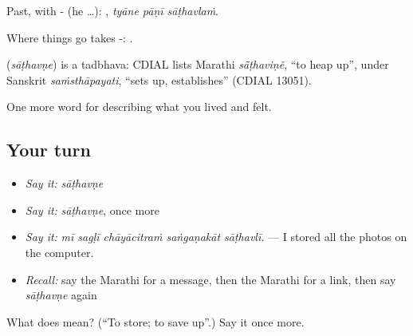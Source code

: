 Past, with - (he …):   , \emph{tyāne pāṇī sāṭhavlaṁ}.

Where things go takes -:  .

\begin{cousinweb}
\textbf{} (\emph{sāṭhavṇe}) is a tadbhava: CDIAL lists Marathi \emph{sā̃ṭhaviṇẽ}, \textquotedblleft{}to heap up\textquotedblright{}, under Sanskrit \emph{saṁsthāpayati}, \textquotedblleft{}sets up, establishes\textquotedblright{} (CDIAL 13051).
\end{cousinweb}

\begin{grammarlens}[title={What you've built}]
One more word for describing what you lived and felt.
\end{grammarlens}

\subsection*{Your turn}
\begin{itemize}
\raggedright
  \item \emph{Say it:} \emph{sāṭhavṇe}
  \item \emph{Say it:} \emph{sāṭhavṇe}, once more
  \item \emph{Say it:} \emph{mī sagḷī chāyācitraṁ saṅgaṇakāt sāṭhavlī.} — I stored all the photos on the computer.
  \item \emph{Recall:} say the Marathi for a message, then the Marathi for a link, then say \emph{sāṭhavṇe} again
\end{itemize}

\begin{tcolorbox}[breakable,colback=teal!4,colframe=teal!35!black,title={Before you move on}]
What does  mean? (\textquotedblleft{}To store; to save up\textquotedblright{}.) Say it once more.
\end{tcolorbox}
